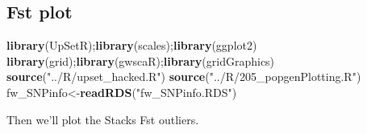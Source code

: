 \documentclass[11pt,]{article}
\newenvironment{Shaded}{\begin{snugshade}}{\end{snugshade}}
\newcommand{\KeywordTok}[1]{\textcolor[rgb]{0.13,0.29,0.53}{\textbf{#1}}}
\newcommand{\StringTok}[1]{\textcolor[rgb]{0.31,0.60,0.02}{#1}}
\newcommand{\NormalTok}[1]{#1}
\begin{document}
\subsection{Fst plot}\label{fst-plot}

\begin{Shaded}
\begin{Highlighting}[]
\KeywordTok{library}\NormalTok{(UpSetR);}\KeywordTok{library}\NormalTok{(scales);}\KeywordTok{library}\NormalTok{(ggplot2)}
\KeywordTok{library}\NormalTok{(grid);}\KeywordTok{library}\NormalTok{(gwscaR);}\KeywordTok{library}\NormalTok{(gridGraphics)}
\KeywordTok{source}\NormalTok{(}\StringTok{"../R/upset_hacked.R"}\NormalTok{)}
\KeywordTok{source}\NormalTok{(}\StringTok{"../R/205_popgenPlotting.R"}\NormalTok{)}
\NormalTok{fw_SNPinfo<-}\KeywordTok{readRDS}\NormalTok{(}\StringTok{"fw_SNPinfo.RDS"}\NormalTok{)}
\end{Highlighting}
\end{Shaded}

Then we'll plot the Stacks Fst outliers.
\end{document}
